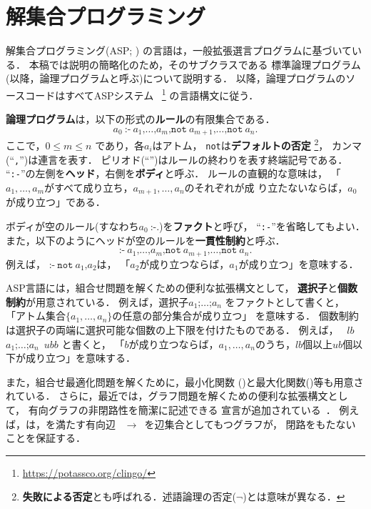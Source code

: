 ﻿%
\section{解集合プログラミング}\label{chap:asp}

解集合プログラミング(ASP; \cite{%
  Baral03:cambridge,%
  Gelfond88:iclp,%
  Inoue08:jssst,%
  Niemela99:amai})
の言語は，一般拡張選言プログラムに基づいている．
本稿では説明の簡略化のため，そのサブクラスである
標準論理プログラム(以降，論理プログラムと呼ぶ)について説明する．
以降，論理プログラムのソースコードはすべてASPシステム
{\clingo}~\footnote{\url{https://potassco.org/clingo/}}
の言語構文に従う．

\textbf{論理プログラム}は，以下の形式の\textbf{ルール}の有限集合である．
\[
  a_0\ \texttt{:-}\
  a_1\texttt{,}\dots\texttt{,}a_m\texttt{,}
  \texttt{not}\ {a_{m+1}}\texttt{,}\dots\texttt{,}\texttt{not}\ {a_n}\texttt{.}
\]
ここで，$0\leq m\leq n$ であり，各$a_i$はアトム，
\texttt{not}は\textbf{デフォルトの否定}
\footnote{\textbf{失敗による否定}とも呼ばれる．述語論理の否定($\neg$)とは意味が異なる．}，
カンマ(``\texttt{,}'')は連言を表す．
ピリオド(``'')はルールの終わりを表す終端記号である．
``\texttt{:-}''の左側を\textbf{ヘッド}，右側を\textbf{ボディ}と呼ぶ．
ルールの直観的な意味は，
「$a_1,\ldots,a_m$がすべて成り立ち，$a_{m+1},\ldots,a_n$のそれぞれが成
り立たないならば，$a_0$が成り立つ」である．

ボディが空のルール(すなわち\(a_0\ \texttt{:-.}\))を\textbf{ファクト}と呼び，
``\texttt{:-}''を省略してもよい．
また，以下のようにヘッドが空のルールを\textbf{一貫性制約}と呼ぶ．
\[
  \texttt{:-} \ a_1\texttt{,}\dots\texttt{,}a_m\texttt{,}
  \texttt{not}\ {a_{m+1}}\texttt{,}\dots\texttt{,}\texttt{not}\ {a_n}\texttt{.}
\]
例えば，
\(\texttt{:-}\ \texttt{not}\ a_1\texttt{,} {a_{2}}\)は，
「$a_2$が成り立つならば，$a_1$が成り立つ」を意味する．

ASP言語には，組合せ問題を解くための便利な拡張構文として，
\textbf{選択子}と\textbf{個数制約}が用意されている．
例えば，選択子\code{\{}\(a_1\texttt{;}\dots\texttt{;}a_n\)\code{\}}
をファクトとして書くと，
「アトム集合\(\{a_1,\dots,a_n\}\)の任意の部分集合が成り立つ」
を意味する．
個数制約は選択子の両端に選択可能な個数の上下限を付けたものである．
例えば，
\ $lb$\ \code{\{}\(a_1\texttt{;}\dots\texttt{;}a_n\)\code{\}}\ $ub$\code{,}$b$
と書くと，
「$b$が成り立つならば，$a_1,\dots,a_n$のうち，$lb$個以上$ub$個以下が成り立つ」を意味する．

また，組合せ最適化問題を解くために，最小化関数
()と最大化関数()等も用意されている．
さらに，最近では，グラフ問題を解くための便利な拡張構文として，
有向グラフの非閉路性を簡潔に記述できる
宣言が追加されている~\cite{bomanson16:acyclicity}．
例えば，は，を満たす有向辺
~$\rightarrow$~を辺集合としてもつグラフが，
閉路をもたないことを保証する．

